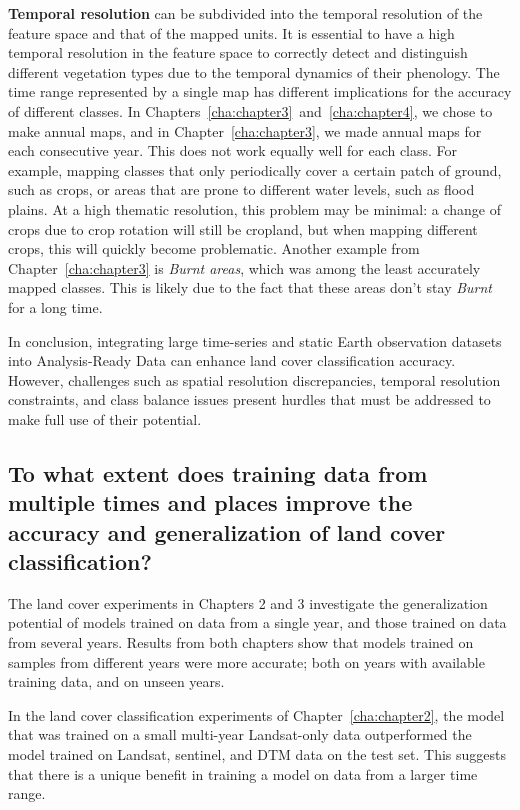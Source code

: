             \textbf{Temporal resolution} can be subdivided into the temporal resolution of the feature space and that of the mapped units. It is essential to have a high temporal resolution in the feature space to correctly detect and distinguish different vegetation types due to the temporal dynamics of their phenology. The time range represented by a single map has different implications for the accuracy of different classes. In Chapters\@~\ref{cha:chapter3}\@~and\@~\ref{cha:chapter4}, we chose to make annual maps, and in Chapter\@~\ref{cha:chapter3}, we made annual maps for each consecutive year. This does not work equally well for each class. For example, mapping classes that only periodically cover a certain patch of ground, such as crops, or areas that are prone to different water levels, such as flood plains. At a high thematic resolution, this problem may be minimal: a change of crops due to crop rotation will still be cropland, but when mapping different crops, this will quickly become problematic. Another example from Chapter\@~\ref{cha:chapter3} is \textit{Burnt areas}, which was among the least accurately mapped classes. This is likely due to the fact that these areas don't stay \textit{Burnt} for a long time.

        In conclusion, integrating large time-series and static Earth observation datasets into Analysis-Ready Data can enhance land cover classification accuracy. However, challenges such as spatial resolution discrepancies, temporal resolution constraints, and class balance issues present hurdles that must be addressed to make full use of their potential.
            
    \subsection{To what extent does training data from multiple times and places improve the accuracy and generalization of land cover classification?}
    \label{syn:rq2}
    
        The land cover experiments in Chapters 2 and 3 investigate the generalization potential of models trained on data from a single year, and those trained on data from several years. Results from both chapters show that models trained on samples from different years were more accurate; both on years with available training data, and on unseen years. 
        
        In the land cover classification experiments of Chapter~\ref{cha:chapter2}, the model that was trained on a small multi-year Landsat-only data outperformed the model trained on Landsat, sentinel, and DTM data on the test set. This suggests that there is a unique benefit in training a model on data from a larger time range.
        
